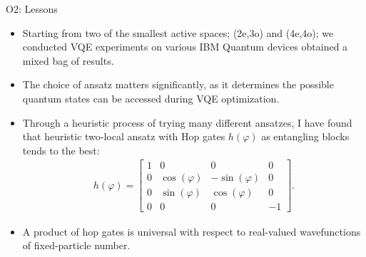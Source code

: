 \begin{frame}{O2: Lessons}
  \begin{itemize}
    \setlength\itemsep{0.1em}
    \item Starting from two of the smallest active spaces; (2e,3o) and (4e,4o); we conducted VQE experiments on various IBM Quantum devices obtained a mixed bag of results.

    \item The choice of ansatz matters significantly, as it determines the possible quantum states can be accessed during VQE optimization.

    \item Through a heuristic process of trying many different ansatzes,
      I have found that heuristic {\color{red}two-local} ansatz with Hop gates $h(\varphi)$ as entangling blocks tends to the best:
      \begin{align*}
        h(\varphi) =
          \begin{bmatrix}
            1 & 0               &  0                & 0 \\
            0 & \cos{(\varphi)} & -\sin{(\varphi)}  & 0 \\
            0 & \sin{(\varphi)} &  \cos{(\varphi)}  & 0 \\
            0 & 0               &  0                & -1
          \end{bmatrix}.
      \end{align*}

    \item A product of hop gates is universal with respect to real-valued wavefunctions of fixed-particle number.
  \end{itemize}
\end{frame}

